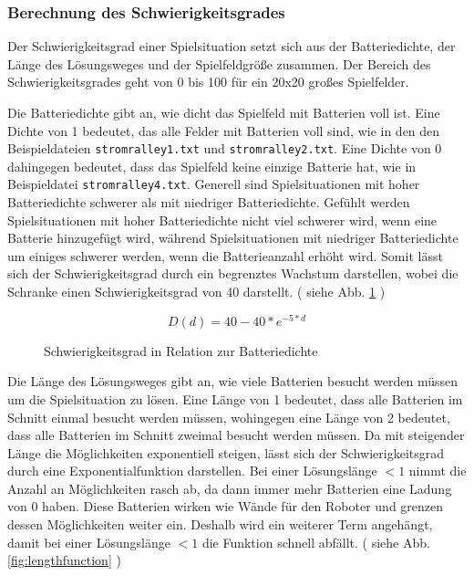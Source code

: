 \documentclass[a4paper,10pt,ngerman]{scrartcl}
\newcommand{\abbref}[1]{
  siehe Abb. \ref{#1}
}
\begin{document}
\subsubsection{Berechnung des Schwierigkeitsgrades}
Der Schwierigkeitsgrad einer Spielsituation setzt sich aus der Batteriedichte, der Länge des Lösungsweges und der Spielfeldgröße zusammen.
Der Bereich des Schwierigkeitsgrades geht von 0 bis 100 für ein 20x20 großes Spielfelder.

Die Batteriedichte gibt an, wie dicht das Spielfeld mit Batterien voll ist. Eine Dichte von 1 bedeutet, das alle Felder mit Batterien voll sind,
wie in den den Beispieldateien \texttt{stromralley1.txt} und \texttt{stromralley2.txt}. Eine Dichte von 0 dahingegen bedeutet, dass das Spielfeld
keine einzige Batterie hat, wie in Beispieldatei \texttt{stromralley4.txt}. Generell sind Spielsituationen mit hoher Batteriedichte schwerer als
mit niedriger Batteriedichte. Gefühlt werden Spielsituationen mit hoher Batteriedichte nicht viel schwerer wird, wenn eine Batterie hinzugefügt wird,
während Spielsituationen mit niedriger Batteriedichte um einiges schwerer werden, wenn die Batterieanzahl erhöht wird.
Somit lässt sich der Schwierigkeitsgrad durch ein begrenztes Wachstum darstellen, wobei die Schranke einen Schwierigkeitsgrad von 40 darstellt.
(\abbref{fig:batterydensity})

$$ D(d) = 40 - 40 * e^{-5 * d} $$

\begin{figure}[ht]
  \centering
  \caption{Schwierigkeitsgrad in Relation zur Batteriedichte}
  \label{fig:batterydensity}
\end{figure}

Die Länge des Lösungsweges gibt an, wie viele Batterien besucht werden müssen um die Spielsituation zu lösen.
Eine Länge von 1 bedeutet, dass alle Batterien im Schnitt einmal besucht werden müssen,
wohingegen eine Länge von 2 bedeutet, dass alle Batterien im Schnitt zweimal besucht werden müssen.
Da mit steigender Länge die Möglichkeiten exponentiell steigen, lässt sich der Schwierigkeitsgrad durch eine Exponentialfunktion darstellen.
Bei einer Lösungslänge $< 1$ nimmt die Anzahl an Möglichkeiten rasch ab, da dann immer mehr Batterien eine Ladung von 0 haben.
Diese Batterien wirken wie Wände für den Roboter und grenzen dessen Möglichkeiten weiter ein.
Deshalb wird ein weiterer Term angehängt, damit bei einer Lösungslänge $< 1$ die Funktion schnell abfällt.
(\abbref{fig:lengthfunction})
\end{document}
